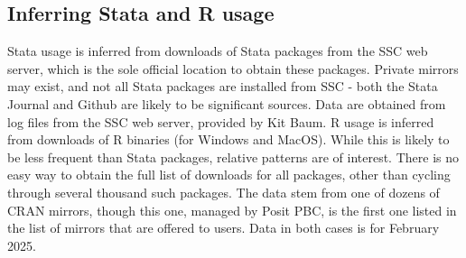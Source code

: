 \documentclass{article}
\begin{document}
\subsection*{Inferring Stata and R usage}

Stata usage is inferred from downloads of Stata packages from the SSC web server, which is the sole official location to obtain these packages. Private mirrors may exist, and not all Stata packages are installed from SSC - both the Stata Journal and Github are likely to be significant sources. Data are obtained from log files from the SSC web server, provided by Kit Baum. R usage is inferred from downloads of  R binaries (for Windows and MacOS). While this is likely to be less frequent than Stata packages, relative patterns are of interest. There is no easy way to obtain the full list of downloads for all packages, other than cycling through several thousand such packages. The data stem from one of dozens of \ac{CRAN} mirrors, though this one, managed by Posit PBC, is the first one listed in the list of mirrors that are offered to users. Data in both cases is for February 2025.
\end{document}
